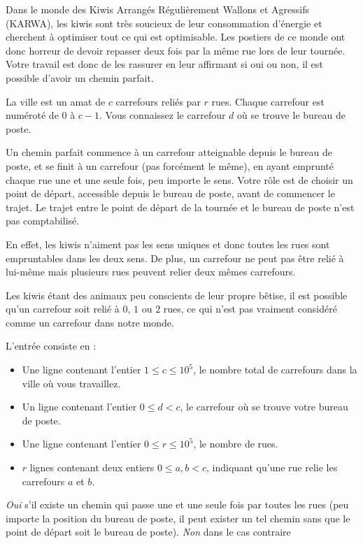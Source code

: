 

Dans le monde des Kiwis Arrangés Régulièrement Wallons et Agressifs (KARWA), les kiwis sont très soucieux de leur consommation d'énergie et cherchent à optimiser tout ce qui est optimisable. Les postiers de ce monde ont donc horreur de devoir repasser deux fois par la même rue lors de leur tournée. Votre travail est donc de les rassurer en leur affirmant si oui ou non, il est possible d'avoir un chemin parfait.

La ville est un amat de $c$ carrefours reliés par $r$ rues. Chaque carrefour est numéroté de $0$ à $c-1$. Vous connaissez le carrefour $d$ où se trouve le bureau de poste.

Un chemin parfait commence à un carrefour atteignable depuis le bureau de poste, et se finit à un carrefour (pas forcément le même), en ayant emprunté chaque rue une et une seule fois, peu importe le sens. Votre rôle est de choisir un point de départ, accessible depuis le bureau de poste, avant de commencer le trajet. Le trajet entre le point de départ de la tournée et le bureau de poste n'est pas comptabilisé.

En effet, les kiwis n'aiment pas les sens uniques et donc toutes les rues sont empruntables dans les deux sens. De plus, un carrefour ne peut pas être relié à lui-même mais plusieurs rues peuvent relier deux mêmes carrefours.

Les kiwis étant des animaux peu conscients de leur propre bêtise, il est possible qu'un carrefour soit relié à $0$, $1$ ou $2$ rues, ce qui n'est pas vraiment considéré comme un carrefour dans notre monde.

\begin{Input}
    L'entrée consiste en :
    \begin{itemize}
        \item Une ligne contenant l'entier $1 \leq c \leq 10^5$, le nombre total de carrefours dans la ville où vous travaillez.
        \item Un ligne contenant l'entier $0 \leq d < c$, le carrefour où se trouve votre bureau de poste.
        \item Une ligne contenant l'entier $0 \leq r \leq 10^5$, le nombre de rues.
        \item $r$ lignes contenant deux entiers $0 \leq a,b < c$, indiquant qu'une rue relie les carrefours $a$ et $b$.
    \end{itemize}
\end{Input}

\begin{Output}
    \emph{Oui} s'il existe un chemin qui passe une et une seule fois par toutes les rues (peu importe la position du bureau de poste, il peut exister un tel chemin sans que le point de départ soit le bureau de poste). \emph{Non} dans le cas contraire
\end{Output}
